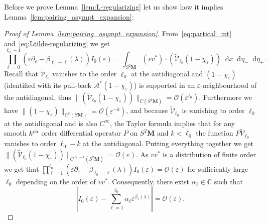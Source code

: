 \documentclass[10pt]{amsart}
\theoremstyle{definition}
\newcommand{\mc}{\mathcal}
\newcommand{\cc}{\mathbb{C}}
\newcommand{\bfm}{\mathbf{M}}
\newcommand{\til}{\widetilde}
\newcommand{\intd}{\mathop{}\!\mathrm{d}}
\begin{document}
Before we prove Lemma~\ref{lem:L-regularizing} let us show how it implies Lemma~\ref{lem:pairing_asympt_expansion}:
\begin{proof}[Proof of Lemma~\ref{lem:pairing_asympt_expansion}]
From~\eqref{eq:partical_int} and~\eqref{eq:Ltilde-regularizing} we get
\[
\prod_{\ell=0}^{\ell_0-1} (\varepsilon\partial_\varepsilon - \beta_{\ell_0-\ell}(\lambda))I_0(\varepsilon) = \int_{S^2\mathbf M} (vv^*) \cdot \left(\til{\mathcal V}_{\ell_0}(1-\chi_\varepsilon)\right)
\intd x\intd\eta_-\intd\eta_+.
\]
Recall that $\til{\mathcal V}_{\ell_0}$ vanishes to the order $\ell_0$ at the antidiagonal and $(1-\chi_\varepsilon)$ (identified with its pull-back $\mc{A}^*(1-\chi_\varepsilon)$) is supported in an $\varepsilon$-neighbourhood of the antidiagonal, thus $\|(\til{\mathcal V}_{\ell_0}(1-\chi_\varepsilon))\|_{C(S^2{\bfm})} = \mc{O}(\varepsilon^{\ell_0})$. Furthermore we have $\|(1-\chi_\varepsilon)\|_{C^k(S{\bfm})} =\mathcal O(\varepsilon^{-k})$, and because $\til{\mathcal V}_{\ell_0}$ is vanishing to order $\ell_0$ at the antidiagonal and is also $C^\infty$, the Taylor formula implies that for any smooth $k^{\rm th}$ order differential operator $P$ on $S^2{\bfm}$ and $k<\ell_0$ the function $P\til{\mathcal V}_{\ell_0}$ vanishes to order $\ell_0-k$ at the antidiagonal. Putting everything together we get $\|(\til{\mathcal V}_{\ell_0}(1-\chi_\varepsilon))\|_{C^{\ell_0 - 1}(S^2{\bfm})} = \mc{O}(\varepsilon)$. As $vv^*$ is a distribution of finite order we get that $\prod_{\ell=1}^{\ell_0} (\varepsilon\partial_\varepsilon - \beta_{\ell_0-\ell}(\lambda))I_0(\varepsilon) = \mc{O}(\varepsilon)$ for sufficiently large $\ell_0$ depending on the order of $vv^*$. Consequently, there exist $\alpha_\ell\in\cc$ such that
\[
\left|I_0(\varepsilon) - \sum_{\ell=1}^{\ell_0} \alpha_\ell \varepsilon^{\beta_\ell(\lambda)}\right| = \mc{O}(\varepsilon).
\]


\end{proof}
\end{document}
